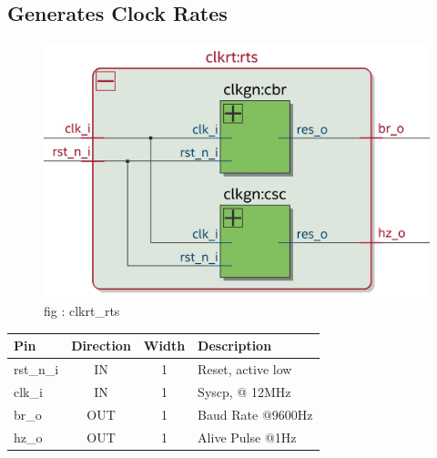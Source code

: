 \documentclass[12pt,a4 paper] {report}
\begin{document}
\subsection{Generates Clock Rates}
\begin{figure}[h]
	\centering
	\includegraphics[scale=0.3]{../png/clkrt_rts.png}
	\newline
	fig : clkrt\_rts \\
\end{figure}

\begin{center}
	\begin{tabular}{ | p{2cm} | c | c | p{5cm} |}
		\hline
		\textbf{Pin} & \textbf{Direction} & \textbf{Width} & \textbf{Description} \\
		\hline	
		rst\_n\_i & IN & 1 & Reset, active low \\
		\hline
		clk\_i & IN & 1 & Syscp, @ 12MHz \\
		\hline
		br\_o & OUT & 1 & Baud Rate @9600Hz \\
		\hline
		hz\_o & OUT & 1 & Alive Pulse @1Hz \\
		\hline
	\end{tabular}
\end{center}

\newpage
\end{document}
